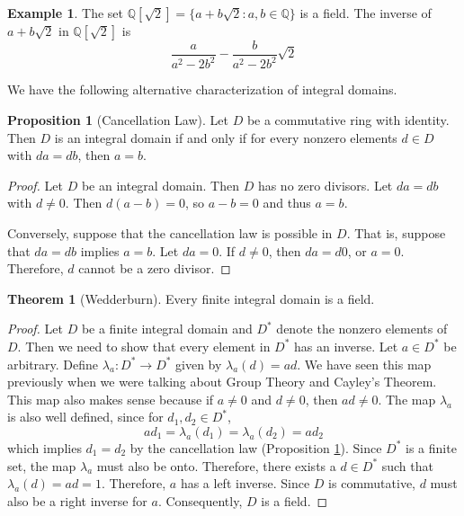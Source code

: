 \documentclass[11pt]{book}
\theoremstyle{definition}\newtheorem{definition}[subsection]{Definition}
\theoremstyle{definition}\newtheorem{example}[subsection]{Example}
\theoremstyle{definition}\newtheorem{notation}[subsection]{Notation}
\theoremstyle{definition}\newtheorem{remark}[subsection]{Remark}
\theoremstyle{theorem}\newtheorem{theorem}[subsection]{Theorem}
\theoremstyle{theorem}\newtheorem{lemma}[subsection]{Lemma}
\theoremstyle{theorem}\newtheorem{proposition}[subsection]{Proposition}
\theoremstyle{theorem}\newtheorem{corollary}[subsection]{Corollary}
\newcommand{\Q}{\mathbb{Q}}
\begin{document}
\begin{example}\label{example:1.2.3}
    The set $\Q[\sqrt{2}] = \{a + b\sqrt{2} : a, b \in \Q\}$ is a field. The inverse of $a + b\sqrt{2}$ in $\Q[\sqrt{2}]$ is
    \begin{equation*}
        \frac{a}{a^2 - 2b^2} - \frac{b}{a^2 - 2b^2}\sqrt{2}
    \end{equation*}
\end{example}

We have the following alternative characterization of integral domains.

\begin{proposition}[Cancellation Law]\label{proposition:1.2.4}
    Let $D$ be a commutative ring with identity. Then $D$ is an integral domain if and only if for every nonzero elements $d \in D$ with $da = db$, then $a = b$.
\end{proposition}

\begin{proof}
    Let $D$ be an integral domain. Then $D$ has no zero divisors. Let $da = db$ with $d \neq 0$. Then $d(a - b) = 0$, so $a - b = 0$ and thus $a = b$.

    Conversely, suppose that the cancellation law is possible in $D$. That is, suppose that $da = db$ implies $a = b$. Let $da = 0$. If $d \neq 0$, then $da = d0$, or $a = 0$. Therefore, $d$ cannot be a zero divisor.
\end{proof}

\begin{theorem}[Wedderburn]\label{theorem:1.2.5}
    Every finite integral domain is a field.
\end{theorem}

\begin{proof}
    Let $D$ be a finite integral domain and $D^*$ denote the nonzero elements of $D$. Then we need to show that every element in $D^*$ has an inverse. Let $a \in D^*$ be arbitrary. Define $\lambda_a : D^* \to D^*$ given by $\lambda_a(d) = ad$. We have seen this map previously when we were talking about Group Theory and Cayley's Theorem. This map also makes sense because if $a \neq 0$ and $d \neq 0$, then $ad \neq 0$. The map $\lambda_a$ is also well defined, since for $d_1, d_2 \in D^*$,
    \begin{equation*}
        ad_1 = \lambda_a(d_1) = \lambda_a(d_2) = ad_2
    \end{equation*}
    which implies $d_1 = d_2$ by the cancellation law (Proposition \ref{proposition:1.2.4}). Since $D^*$ is a finite set, the map $\lambda_a$ must also be onto. Therefore, there exists a $d \in D^*$ such that $\lambda_a(d) = ad = 1$. Therefore, $a$ has a left inverse. Since $D$ is commutative, $d$ must also be a right inverse for $a$. Consequently, $D$ is a field.
\end{proof}
\end{document}
